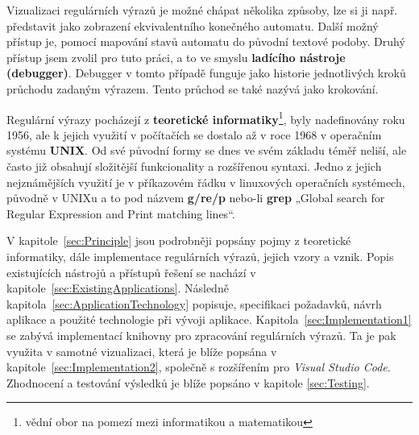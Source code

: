 Vizualizaci regulárních výrazů je možné chápat několika způsoby, lze si ji např. představit jako zobrazení ekvivalentního konečného automatu.
Další možný přístup je, pomocí mapování stavů automatu do původní textové podoby. 
Druhý přístup jsem zvolil pro tuto práci, a to ve smyslu \textbf{ladícího nástroje (debugger)}. 
Debugger v tomto případě funguje jako historie jednotlivých kroků průchodu zadaným výrazem. 
Tento průchod se také nazývá jako krokování.

Regulární výrazy pocházejí z \textbf{teoretické informatiky}\footnote{vědní obor na pomezí mezi informatikou a matematikou}, byly nadefinovány roku 1956, ale k jejich využití v počítačích se dostalo až v roce 1968 v operačním systému \textbf{UNIX}.
Od své původní formy se dnes ve svém základu téměř neliší, ale často již obsahují složitější funkcionality a rozšířenou syntaxi.
Jedno z jejich nejznámějších využití je v příkazovém řádku v linuxových operačních systémech, původně v UNIXu a to pod názvem \textbf{g/re/p} nebo-li \textbf{grep} 
„Global search for Regular Expression and Print matching lines“\cite{Wikipedia_2024}. 

V kapitole~\ref{sec:Principle} jsou podrobněji popsány pojmy z teoretické informatiky, dále implementace regulárních výrazů, jejich vzory a vznik.
Popis existujících nástrojů a přístupů řešení se nachází v kapitole~\ref{sec:ExistingApplications}.
Následně kapitola~\ref{sec:ApplicationTechnology} popisuje, specifikaci požadavků, návrh aplikace a použité technologie při vývoji aplikace.
Kapitola~\ref{sec:Implementation1} se zabývá implementací knihovny pro zpracování regulárních výrazů. 
Ta je pak využita v samotné vizualizaci, která je blíže popsána v kapitole~\ref{sec:Implementation2}, společně s rozšířením pro \textit{Visual Studio Code}.
Zhodnocení a testování výsledků je blíže popsáno v kapitole \ref{sec:Testing}.

\endinput